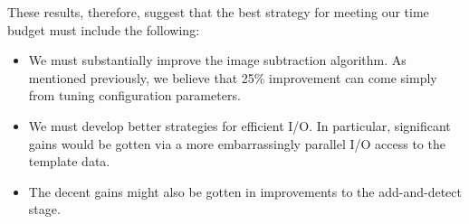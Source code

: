 These results, therefore, suggest that the best strategy for meeting
our time budget must include the following:

\begin{itemize}
\item We must substantially improve the image subtraction algorithm.
  As mentioned previously, we believe that 25\% improvement can come
  simply from tuning configuration parameters.  
\item We must develop better strategies for efficient I/O.  In
  particular, significant gains would be gotten via a more
  embarrassingly parallel I/O access to the template data.
\item The decent gains might also be gotten in improvements to the
  add-and-detect stage.  
\end{itemize}

